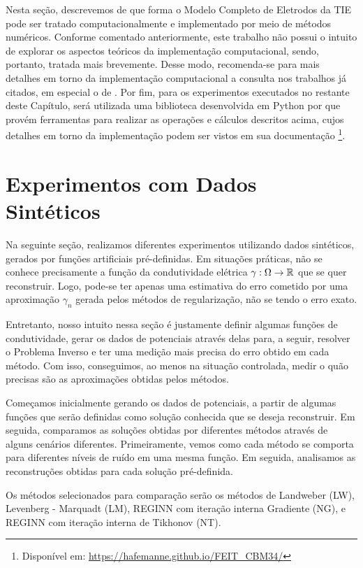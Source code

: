 \vspace{1em}

Nesta seção, descrevemos de que forma o Modelo Completo de Eletrodos da TIE pode ser tratado computacionalmente e implementado por meio de métodos numéricos. Conforme comentado anteriormente, este trabalho não possui o intuito de explorar os aspectos teóricos da implementação computacional, sendo, portanto, tratada mais brevemente. Desse modo, recomenda-se para mais detalhes em torno da implementação computacional a consulta nos trabalhos já citados, em especial o de . Por fim, para os experimentos executados no restante deste Capítulo, será utilizada uma biblioteca desenvolvida em Python por  que provém ferramentas para realizar as operações e cálculos descritos acima, cujos detalhes em torno da implementação podem ser vistos em sua documentação \footnote{Disponível em: \url{https://hafemanne.github.io/FEIT\_CBM34/}}.


\section{Experimentos com Dados Sintéticos}

Na seguinte seção, realizamos diferentes experimentos utilizando dados sintéticos, gerados por funções artificiais pré-definidas. Em situações práticas, não se conhece precisamente a função da condutividade elétrica $\gamma: \Omega \to \mathbb{R}$ que se quer reconstruir. Logo, pode-se ter apenas uma estimativa do erro cometido por uma aproximação $\gamma_n$ gerada pelos métodos de regularização, não se tendo o erro exato. 

Entretanto, nosso intuito nessa seção é justamente definir algumas funções de condutividade, gerar os dados de potenciais através delas para, a seguir, resolver o Problema Inverso e ter uma medição mais precisa do erro obtido em cada método. Com isso, conseguimos, ao menos na situação controlada, medir o quão precisas são as aproximações obtidas pelos métodos.

Começamos inicialmente gerando os dados de potenciais, a partir de algumas funções que serão definidas como solução conhecida que se deseja reconstruir. Em seguida, comparamos as soluções obtidas por diferentes métodos através de alguns cenários diferentes. Primeiramente, vemos como cada método se comporta para diferentes níveis de ruído em uma mesma função. Em seguida, analisamos as reconstruções obtidas para cada solução pré-definida. 

Os métodos selecionados para comparação serão os métodos de Landweber (LW), Levenberg - Marquadt (LM), REGINN com iteração interna Gradiente (NG), e REGINN com iteração interna de Tikhonov (NT).


